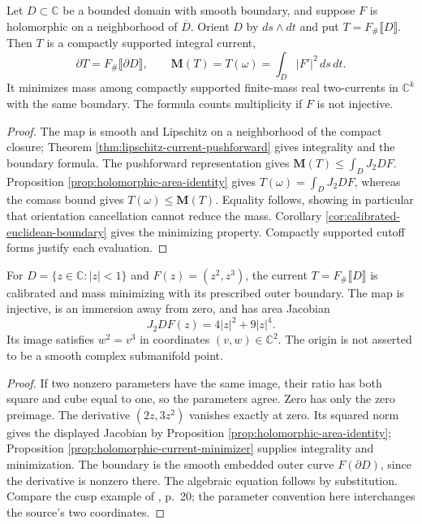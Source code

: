 \begin{proposition}\label{prop:holomorphic-current-minimizer}
Let $D\subset\mathbb C$ be a bounded domain with smooth boundary, and suppose $F$ is holomorphic on a neighborhood of $\overline D$. Orient $D$ by $ds\wedge dt$ and put $T=F_\#\llbracket D\rrbracket$. Then $T$ is a compactly supported integral current,
\[
 \partial T=F_\#\llbracket\partial D\rrbracket,
 \qquad \mathbf M(T)=T(\omega)=\int_D|F'|^2\,ds\,dt.
\]
It minimizes mass among compactly supported finite-mass real two-currents in $\mathbb C^k$ with the same boundary. The formula counts multiplicity if $F$ is not injective.
\end{proposition}
\begin{proof}
The map is smooth and Lipschitz on a neighborhood of the compact closure; Theorem \ref{thm:lipschitz-current-pushforward} gives integrality and the boundary formula. The pushforward representation gives $\mathbf M(T)\leq\int_DJ_2DF$. Proposition \ref{prop:holomorphic-area-identity} gives $T(\omega)=\int_DJ_2DF$, whereas the comass bound gives $T(\omega)\leq\mathbf M(T)$. Equality follows, showing in particular that orientation cancellation cannot reduce the mass. Corollary \ref{cor:calibrated-euclidean-boundary} gives the minimizing property. Compactly supported cutoff forms justify each evaluation.
\end{proof}

\begin{example}\label{ex:complex-cusp-current}
For $D=\{z\in\mathbb C:|z|<1\}$ and $F(z)=(z^2,z^3)$, the current $T=F_\#\llbracket D\rrbracket$ is calibrated and mass minimizing with its prescribed outer boundary. The map is injective, is an immersion away from zero, and has area Jacobian
\[
 J_2DF(z)=4|z|^2+9|z|^4.
\]
Its image satisfies $w^2=v^3$ in coordinates $(v,w)\in\mathbb C^2$. The origin is not asserted to be a smooth complex submanifold point.
\end{example}
\begin{proof}
If two nonzero parameters have the same image, their ratio has both square and cube equal to one, so the parameters agree. Zero has only the zero preimage. The derivative $(2z,3z^2)$ vanishes exactly at zero. Its squared norm gives the displayed Jacobian by Proposition \ref{prop:holomorphic-area-identity}; Proposition \ref{prop:holomorphic-current-minimizer} supplies integrality and minimization. The boundary is the smooth embedded outer curve $F(\partial D)$, since the derivative is nonzero there. The algebraic equation follows by substitution. Compare the cusp example of \cite{Minter}, p.~20; the parameter convention here interchanges the source's two coordinates.
\end{proof}

